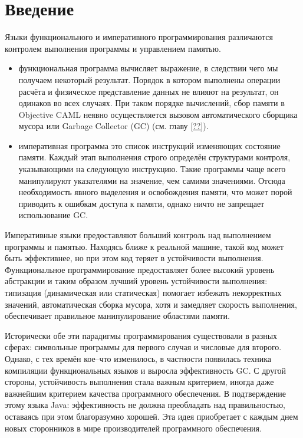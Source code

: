 \section{Введение}

Языки функционального и императивного программирования различаются контролем
выполнения программы и управлением памятью.

\begin{itemize}
	\item функциональная программа вычисляет выражение, в следствии чего мы
получаем некоторый результат. Порядок в котором выполнены операции расчёта и
физическое представление данных не влияют на результат, он одинаков во всех
случаях. При таком порядке вычислений, сбор памяти в Objective CAML неявно
осуществляется вызовом автоматического сборщика мусора или Garbage Collector
(GC) (см. главу \ref{??}).

	\item императивная программа это список инструкций изменяющих состояние
памяти. Каждый этап выполнения строго определён структурами контроля,
указывающими на следующую инструкцию. Такие программы чаще всего манипулируют
указателями на значение, чем самими значениями. Отсюда необходимость явного
выделения и освобождения памяти, что может порой приводить к ошибкам доступа к
памяти, однако ничто не запрещает использование GC.
\end{itemize}

Императивные языки предоставляют больший контроль над выполнением программы и
памятью. Находясь ближе к реальной машине, такой код может быть эффективнее, но
при этом код теряет в устойчивости выполнения. Функциональное программирование
предоставляет более высокий уровень абстракции и таким образом лучший уровень
устойчивости выполнения: типизация (динамическая или статическая) помогает
избежать некорректных значений, автоматическая сборка мусора, хотя и замедляет
скорость выполнения, обеспечивает правильное манипулирование областями памяти.

Исторически обе эти парадигмы программирования существовали в разных сферах:
символьные программы для первого случая и числовые для второго. Однако, с тех
времён кое--что изменилось, в частности появилась техника компиляции
функциональных языков и выросла эффективность GC. С другой стороны, устойчивость
выполнения стала важным критерием, иногда даже важнейшим критерием качества
программного обеспечения. В подтверждение этому 
языка Java: эффективность не должна преобладать над правильностью, оставаясь при
этом благоразумно хорошей. Эта идея приобретает с каждым днем новых сторонников
в мире производителей программного обеспечения.

